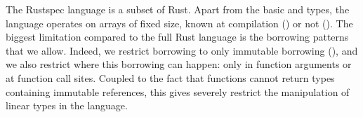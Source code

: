 \documentclass[11pt,a4paper]{article}
\newcommand{\rustspec}{Rustspec}
\begin{document}
\newcommand{\syndef}{$::=$}
\newcommand{\synalt}{\;$|$\;}


\newcommand{\typctx}[1]{\textcolor{green!50!black}{\ensuremath{#1}}}

\newcommand{\typempty}{\typctx{\varnothing}}
\newcommand{\typtyped}{\;\typctx{:}\;}
\newcommand{\typsc}{\typctx{;}\;}
\newcommand{\typcomma}{\typctx{,}\;}
\newcommand{\typarrow}{\typctx{\;\rightarrow}\;}
\newcommand{\typlparen}{\typctx{(}\;}
\newcommand{\typrparen}{\;\typctx{)}}
\newcommand{\typlsquare}{\typctx{[}\;}
\newcommand{\typrsquare}{\;\typctx{]}}
\newcommand{\typlangle}{\typctx{<}\;}
\newcommand{\typrangle}{\;\typctx{>}}
\newcommand{\typeq}{\;\typctx{=}\;}
\newcommand{\typcomp}{\;\typctx{\circ}\;}
\newcommand{\typellipsis}{\typctx{,\ldots,}\;}
\newcommand{\typderive}{\;\typctx{\vdash}\;}
\newcommand{\typsym}{\;\typctx{\sim}\;}
\newcommand{\typproduce}{\;\typctx{\Rrightarrow}\;}


The \rustspec{} language is a subset of Rust. Apart from the basic \synint{} and \synbool{} types,
the language operates on arrays of fixed size, known at compilation (\synarraymacro{}) or not
(\synseq). The biggest limitation compared to the full Rust language is the borrowing patterns
that we allow. Indeed, we restrict borrowing to only immutable borrowing (\synref{}),
and we also restrict where this borrowing can happen: only in function arguments or at function call
sites. Coupled to the fact that functions cannot return types containing immutable references,
this gives severely restrict the manipulation of linear types in the language.
\end{document}
